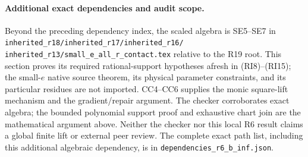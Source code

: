 \paragraph{Additional exact dependencies and audit scope.}
Beyond the preceding dependency index, the scaled algebra is SE5--SE7
in \texttt{inherited\_r18/inherited\_r17/inherited\_r16/
inherited\_r13/small\_e\_all\_r\_contact.tex} relative to the R19
root. This section proves its required rational-support hypotheses
afresh in (RI8)--(RI15); the small-$e$ native source theorem, its
physical parameter constraints, and its particular residues are not
imported. CC4--CC6 supplies the monic square-lift mechanism and the
gradient/repair argument. The checker corroborates exact algebra;
the bounded polynomial support proof and exhaustive chart join are
the mathematical argument above. Neither the checker nor this local
R6 result claims a global finite lift or external peer review.
The complete exact path list, including this additional algebraic
dependency, is in \texttt{dependencies\_r6\_b\_inf.json}.
